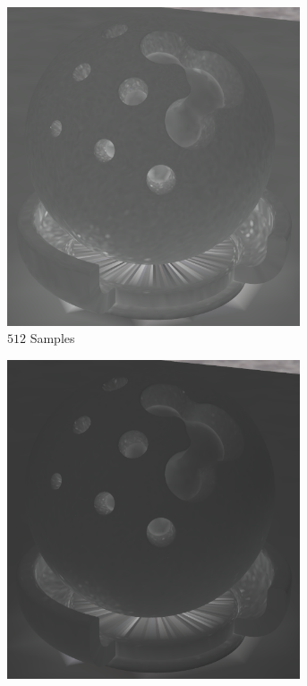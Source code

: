 		\begin{figure}[h]
			\begin{subfigure}[b]{0.33\textwidth}
				\center
				\includegraphics[width=0.95\textwidth]{pic/irr_est-rc-shaderball2-s512-err.png}
				\caption{$512$ Samples}
			\end{subfigure}
			\begin{subfigure}[b]{0.33\textwidth}
				\center
				\includegraphics[width=0.95\textwidth]{pic/irr_est-rc-shaderball2-s4096-err.png}

\end{subfigure}
\end{figure}
